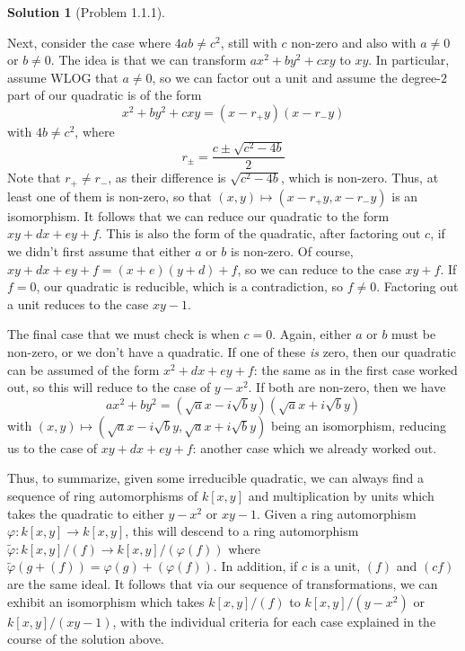 \documentclass[aps,pra,showpacs,notitlepage,onecolumn,superscriptaddress,nofootinbib]{revtex4-1}
\theoremstyle{definition}
\newtheorem{solution}{Solution}[section]
\begin{document}
\begin{solution}[Problem 1.1.1]
\begin{enumerate}
       Next, consider the case where $4ab \neq c^2$, still with $c$ non-zero and also with $a \neq 0$ or $b \neq 0$.
       The idea is that we can transform $ax^2 + by^2 + cxy$ to $xy$. In particular, assume WLOG that $a \neq 0$, so we can factor out a unit
       and assume the degree-$2$ part of our quadratic is of the form
       \begin{equation}
         x^2 + by^2 + cxy = (x - r_{+} y)(x - r_{-} y)
         \end{equation}
       with $4b \neq c^2$, where
       \begin{equation}
         r_{\pm} = \frac{c \pm \sqrt{c^2 - 4b}}{2}
         \end{equation}
       Note that $r_{+} \neq r_{-}$, as their difference is $\sqrt{c^2 - 4b}$, which is non-zero. Thus, at least one of them is non-zero, so that $(x, y) \mapsto (x - r_{+} y, x - r_{-} y)$
       is an isomorphism. It follows that we can reduce our quadratic to the form $xy + dx + ey + f$. This is also the form of the quadratic, after factoring out $c$, if we didn't first assume
       that either $a$ or $b$ is non-zero. Of course, $xy + dx + ey + f = (x + e)(y + d) + f$, so we can reduce to the case $xy + f$. If $f = 0$, our quadratic is reducible, which is a contradiction,
       so $f \neq 0$. Factoring out a unit reduces to the case $xy - 1$.

       The final case that we must check is when $c = 0$. Again, either $a$ or $b$ must be non-zero, or we don't have a quadratic. If one of these \emph{is} zero, then our quadratic can be assumed
       of the form $x^2 + dx + ey + f$: the same as in the first case worked out, so this will reduce to the case of $y - x^2$. If both are non-zero, then we have
       \begin{equation}
         ax^2 + by^2 = (\sqrt{a} x - i \sqrt{b} y)(\sqrt{a} x + i \sqrt{b} y)
         \end{equation}
       with $(x, y) \mapsto (\sqrt{a} x - i \sqrt{b} y, \sqrt{a} x + i \sqrt{b} y)$ being an isomorphism, reducing us to the case of $xy + dx + ey + f$: another case which we already worked out.

       Thus, to summarize, given some irreducible quadratic, we can always find a sequence of ring automorphisms of $k[x, y]$ and multiplication by units which takes the quadratic to
       either $y - x^2$ or $xy - 1$. Given a ring automorphism $\varphi : k[x, y] \rightarrow k[x, y]$, this will descend to a ring automorphism $\widetilde{\varphi} : k[x, y]/(f) \rightarrow k[x, y]/(\varphi(f))$
       where $\widetilde{\varphi}(g + (f)) = \varphi(g) + (\varphi(f))$. In addition, if $c$ is a unit, $(f)$ and $(cf)$ are the same ideal. It follows that via our sequence of transformations, we can exhibit
       an isomorphism which takes $k[x, y]/(f)$ to $k[x, y]/(y - x^2)$ or $k[x, y]/(xy - 1)$, with the individual criteria for each case explained in the course of the solution above.
  \end{enumerate}
  \end{solution}
\end{document}
